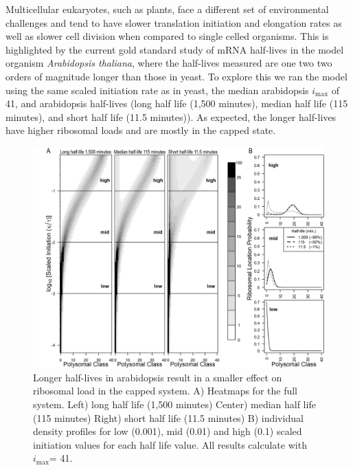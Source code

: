 \documentclass[review]{elsarticle}
\newcommand{\imax}{\ensuremath{i_{\max}}\xspace}
\begin{document}
Multicellular eukaryotes, such as plants, face a different set of environmental challenges and tend to have slower translation initiation and elongation rates as well as slower cell division when compared to single celled organisms. This is highlighted by the current gold standard study of mRNA half-lives in the model organism \textit{Arabidopsis thaliana}, where the half-lives measured are one two two orders of magnitude longer than those in yeast. To explore this we ran the model using the same scaled initiation rate as in yeast, the median arabidopsis \imax of 41, and arabidopsis half-lives (long half life (1,500 minutes), median half life (115 minutes), and short half life (11.5  minutes)). As expected, the longer half-lives have higher ribosomal loads and are mostly in the capped state.

\begin{figure}[!ht]
\centering
\includegraphics[width=120mm]{Images/2023-07-09_Figure2_At_Marking_Rate_range_medianlength_with_labels.png}
\caption{Longer half-lives in arabidopsis result in a smaller effect on ribosomal load in the capped system.  A)  Heatmaps for the full system. Left) long half life (1,500 minutes) Center) median half life (115 minutes) Right) short half life (11.5  minutes)  B) individual density profiles for low (0.001), mid (0.01) and high (0.1) scaled initiation values for each half life value. All results calculate with \imax = 41.}
\end{figure}
\end{document}
